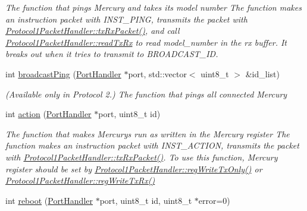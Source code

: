 \begin{DoxyCompactItemize}
\begin{DoxyCompactList}\small\item\em The function that pings Mercury and takes its model number  The function makes an instruction packet with I\+N\+S\+T\+\_\+\+P\+I\+NG,  transmits the packet with \hyperlink{classmercury_1_1_protocol1_packet_handler_ae488c4554064d6dd0ccabb9d2410e8f0}{Protocol1\+Packet\+Handler\+::tx\+Rx\+Packet()},  and call \hyperlink{classmercury_1_1_protocol1_packet_handler_af7212497f4f00a05122cb6ac9702acec}{Protocol1\+Packet\+Handler\+::read\+Tx\+Rx} to read model\+\_\+number in the rx buffer.  It breaks out  when it tries to transmit to B\+R\+O\+A\+D\+C\+A\+S\+T\+\_\+\+ID. \end{DoxyCompactList}\item 
int \hyperlink{classmercury_1_1_protocol1_packet_handler_a7a7b443a3df3066ee50ef93044a1ee14}{broadcast\+Ping} (\hyperlink{classmercury_1_1_port_handler}{Port\+Handler} $\ast$port, std\+::vector$<$ uint8\+\_\+t $>$ \&id\+\_\+list)
\begin{DoxyCompactList}\small\item\em (Available only in Protocol 2.) The function that pings all connected Mercury \end{DoxyCompactList}\item 
int \hyperlink{classmercury_1_1_protocol1_packet_handler_abdd0fb2ce6cda0c13925627020d02418}{action} (\hyperlink{classmercury_1_1_port_handler}{Port\+Handler} $\ast$port, uint8\+\_\+t id)
\begin{DoxyCompactList}\small\item\em The function that makes Mercurys run as written in the Mercury register  The function makes an instruction packet with I\+N\+S\+T\+\_\+\+A\+C\+T\+I\+ON,  transmits the packet with \hyperlink{classmercury_1_1_protocol1_packet_handler_ae488c4554064d6dd0ccabb9d2410e8f0}{Protocol1\+Packet\+Handler\+::tx\+Rx\+Packet()}.  To use this function, Mercury register should be set by \hyperlink{classmercury_1_1_protocol1_packet_handler_a2307c9edac7cef2637f82103c0923075}{Protocol1\+Packet\+Handler\+::reg\+Write\+Tx\+Only()} or \hyperlink{classmercury_1_1_protocol1_packet_handler_a1d3465f477895b2255b5bc9ddddf9e3b}{Protocol1\+Packet\+Handler\+::reg\+Write\+Tx\+Rx()} \end{DoxyCompactList}\item 
int \hyperlink{classmercury_1_1_protocol1_packet_handler_ab2b9559d833754d9ca09f52b5a05adb5}{reboot} (\hyperlink{classmercury_1_1_port_handler}{Port\+Handler} $\ast$port, uint8\+\_\+t id, uint8\+\_\+t $\ast$error=0)

\end{DoxyCompactItemize}
